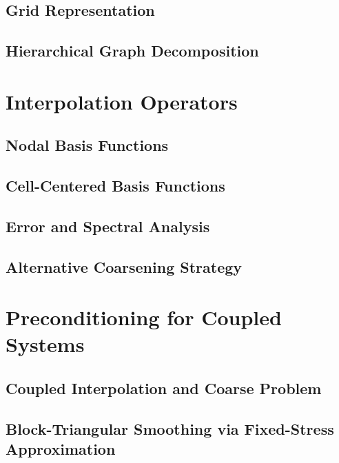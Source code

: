 \subsection{Grid Representation}

\subsection{Hierarchical Graph Decomposition}

\section{Interpolation Operators}

\subsection{Nodal Basis Functions}

\subsection{Cell-Centered Basis Functions}

\subsection{Error and Spectral Analysis}

\subsection{Alternative Coarsening Strategy}

\section{Preconditioning for Coupled Systems}

\subsection{Coupled Interpolation and Coarse Problem}

\subsection{Block-Triangular Smoothing via Fixed-Stress Approximation}

